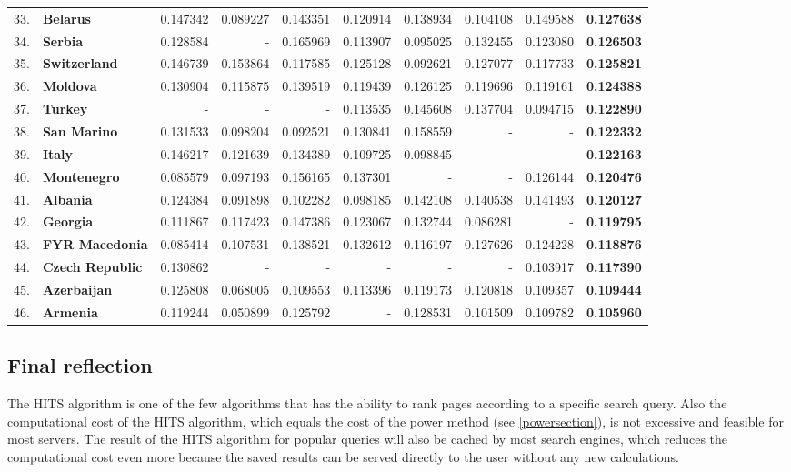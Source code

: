 \documentclass[a4paper,11pt]{report}
\begin{document}
\begin{landscape}
\begin{longtable}{r l | r | r | r | r | r | r | r | r}
33.&\textbf{Belarus}&0.147342&0.089227&0.143351&0.120914&0.138934&0.104108&0.149588&\textbf{0.127638}\\
34.&\textbf{Serbia}&0.128584&-&0.165969&0.113907&0.095025&0.132455&0.123080&\textbf{0.126503}\\
35.&\textbf{Switzerland}&0.146739&0.153864&0.117585&0.125128&0.092621&0.127077&0.117733&\textbf{0.125821}\\
36.&\textbf{Moldova}&0.130904&0.115875&0.139519&0.119439&0.126125&0.119696&0.119161&\textbf{0.124388}\\
37.&\textbf{Turkey}&-&-&-&0.113535&0.145608&0.137704&0.094715&\textbf{0.122890}\\
38.&\textbf{San Marino}&0.131533&0.098204&0.092521&0.130841&0.158559&-&-&\textbf{0.122332}\\
39.&\textbf{Italy}&0.146217&0.121639&0.134389&0.109725&0.098845&-&-&\textbf{0.122163}\\
40.&\textbf{Montenegro}&0.085579&0.097193&0.156165&0.137301&-&-&0.126144&\textbf{0.120476}\\
41.&\textbf{Albania}&0.124384&0.091898&0.102282&0.098185&0.142108&0.140538&0.141493&\textbf{0.120127}\\
42.&\textbf{Georgia}&0.111867&0.117423&0.147386&0.123067&0.132744&0.086281&-&\textbf{0.119795}\\
43.&\textbf{FYR Macedonia}&0.085414&0.107531&0.138521&0.132612&0.116197&0.127626&0.124228&\textbf{0.118876}\\
44.&\textbf{Czech Republic}&0.130862&-&-&-&-&-&0.103917&\textbf{0.117390}\\
45.&\textbf{Azerbaijan}&0.125808&0.068005&0.109553&0.113396&0.119173&0.120818&0.109357&\textbf{0.109444}\\
46.&\textbf{Armenia}&0.119244&0.050899&0.125792&-&0.128531&0.101509&0.109782&\textbf{0.105960}\end{longtable}\label{thub}
\end{landscape}
\subsection{Final reflection}
The HITS algorithm is one of the few algorithms that has the ability to rank pages according to a specific search 
query.
Also the computational cost of the HITS algorithm, which equals the cost of 
the power method (see \ref{powersection}), is not excessive and feasible for most servers. 
The result of the HITS algorithm for popular queries will also be cached by most 
search engines, which reduces the computational cost even more because the saved results can be served
directly to the user without any new calculations. 
\end{document}
